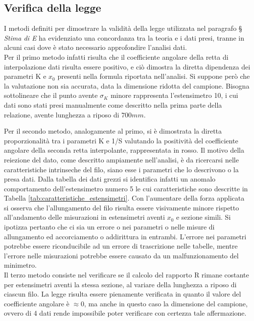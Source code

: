 \documentclass[a4paper,11pt,oneside]{article}
\begin{document}
\subsection{Verifica della legge}
I metodi definiti per dimostrare la validità della legge utilizzata nel paragrafo \S \textit{ Stima di E} ha evidenziato una concordanza tra la teoria e i dati presi, tranne in alcuni casi dove è stato necessario approfondire l'analisi dati.\\
Per il primo metodo infatti risulta che il coefficiente angolare della retta di interpolazione dati risulta essere positivo, e ciò dimostra la diretta dipendenza dei parametri K e $x_0$ presenti nella formula riportata nell'analisi. Si suppone però che la valutazione non sia accurata, data la dimensione ridotta del campione.
Bisogna sottolineare che il punto avente $\sigma_K$ minore rappresenta l'estensimetro 10, i cui dati sono stati presi manualmente come descritto nella prima parte della relazione, avente lunghezza a riposo di $700\si{mm}$.


Per il secondo metodo, analogamente al primo, si è dimostrata la diretta proporzionalità tra i parametri K e 1/S  valutando la positività del coefficiente angolare della seconda retta interpolante, rappresentata in rosso. Il motivo della reiezione del dato, come descritto ampiamente nell'analisi, è da ricercarsi nelle caratteristiche intrinseche del filo, siano esse i parametri che lo descrivono o la presa dati.
Dalla tabella dei dati grezzi si identifica infatti un anomalo comportamento dell'estensimetro numero 5 le cui caratteristiche sono descritte in Tabella \ref{tab:caratteristiche_estensimetri}. Con l'aumentare della forza applicata si osserva che l'allungamento del filo risulta essere visivamente minore rispetto all'andamento delle misurazioni in estensimetri aventi $x_{0}$ e sezione simili. 
Si ipotizza pertanto che ci sia un errore o nei parametri o nelle misure di allungamento ed accorciamento o addirittura in entrambi. L'errore nei parametri potrebbe essere riconducibile ad un errore di trascrizione nelle tabelle, mentre l'errore nelle misurazioni potrebbe essere causato da un malfunzionamento del minimetro.\\


Il terzo metodo consiste nel verificare se il calcolo del rapporto R rimane costante per estensimetri aventi la stessa sezione, al variare della lunghezza a riposo di ciascun filo. La legge risulta essere pienamente verificata in quanto il valore del coefficiente angolare è $\approx 0$, ma anche in questo caso la dimensione del campione, ovvero di 4 dati rende impossibile poter verificare con certezza tale affermazione.\\
\end{document}
